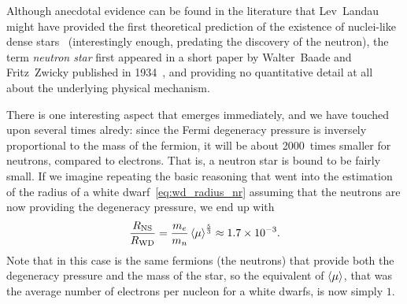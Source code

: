Although anecdotal evidence can be found in the literature that Lev~Landau
might have provided the first theoretical prediction of the existence of
nuclei-like dense stars~\cite{1932PhyZS...1..285L} (interestingly enough, predating
the discovery of the neutron), the term \emph{neutron star}%
first appeared in a short paper by Walter~Baade and Fritz~Zwicky published in
1934~\cite{1934PNAS...20..259B}, and providing no quantitative detail at all about
the underlying physical mechanism.


There is one interesting aspect that emerges immediately, and we have touched upon
several times alredy: since the Fermi degeneracy pressure is inversely proportional
to the mass of the fermion, it will be about 2000~times smaller for neutrons,
compared to electrons. That is, a neutron star is bound to be fairly small. If we
imagine repeating the basic reasoning that went into the estimation of the radius
of a white dwarf~\eqref{eq:wd_radius_nr} assuming
that the neutrons are now providing the degeneracy pressure, we end up with
\begin{align}
  \frac{R_\text{NS}}{R_\text{WD}} = \frac{m_e}{m_n} \left<\mu\right>^\frac{5}{3}
  \approx 1.7 \times 10^{-3}.
\end{align}
Note that in this case is the same fermions (the neutrons) that provide both the
degeneracy pressure and the mass of the star, so the equivalent of $\left<\mu\right>$, that
was the average number of electrons per nucleon for a white dwarfs, is now simply $1$.

